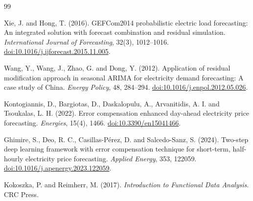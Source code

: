 \documentclass[10pt,a4paper]{article}
\begin{document}
\begin{thebibliography}{99}

Xie, J. and Hong, T. (2016).
GEFCom2014 probabilistic electric load forecasting: An integrated solution with
forecast combination and residual simulation.
\textit{International Journal of Forecasting}, 32(3), 1012--1016.
\href{https://doi.org/10.1016/j.ijforecast.2015.11.005}{doi:10.1016/j.ijforecast.2015.11.005}.

Wang, Y., Wang, J., Zhao, G. and Dong, Y. (2012).
Application of residual modification approach in seasonal ARIMA for electricity
demand forecasting: A case study of China.
\textit{Energy Policy}, 48, 284--294.
\href{https://doi.org/10.1016/j.enpol.2012.05.026}{doi:10.1016/j.enpol.2012.05.026}.

Kontogiannis, D., Bargiotas, D., Daskalopulu, A., Arvanitidis, A. I. and
Tsoukalas, L. H. (2022).
Error compensation enhanced day-ahead electricity price forecasting.
\textit{Energies}, 15(4), 1466.
\href{https://doi.org/10.3390/en15041466}{doi:10.3390/en15041466}.

Ghimire, S., Deo, R. C., Casillas-Pérez, D. and Salcedo-Sanz, S. (2024).
Two-step deep learning framework with error compensation technique for short-term,
half-hourly electricity price forecasting.
\textit{Applied Energy}, 353, 122059.
\href{https://doi.org/10.1016/j.apenergy.2023.122059}{doi:10.1016/j.apenergy.2023.122059}.

Kokoszka, P. and Reimherr, M. (2017).
\textit{Introduction to Functional Data Analysis}.
CRC Press.

\end{thebibliography}
\end{document}
